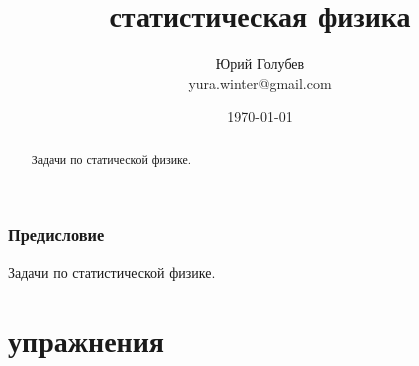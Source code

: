 \documentclass[a4paper,12pt]{article} %
\author{Юрий Голубев\\ yura.winter@gmail.com }
\title{статистическая физика}
\date{\today}
\begin{document}
\maketitle

\begin{abstract}
Задачи по статической физике.
\end{abstract}
\tableofcontents

\section*{Предисловие}


Задачи по статистической физике.






\clearpage
\part{упражнения}
\end{document}
